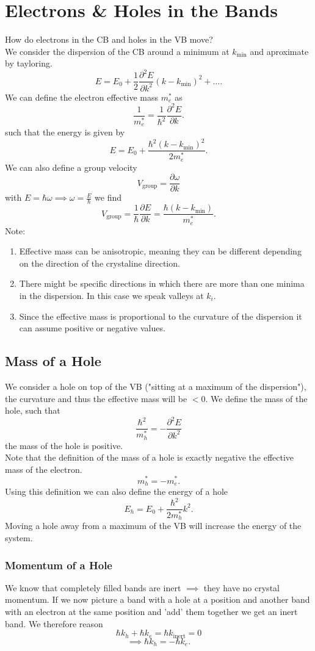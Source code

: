 \documentclass{report}
\begin{document}
\section{Electrons \& Holes in the Bands}
How do electrons in the CB and holes in the VB move?\\
We consider the dispersion of the CB around a minimum at $k_\text{min}$ and aproximate by tayloring. \[
	E = E_0 + \frac{1}{2} \frac{\partial^2 E}{\partial k^2}\left( k - k_\text{min} \right)^2 + \ldots
.\] We can define the electron effective mass $m_e^*$ as \[
\frac{1}{m_e^*} = \frac{1}{\hbar^2} \frac{\partial^2 E}{\partial k}
.\] such that the energy is given by \[
E = E_0 + \frac{\hbar^2 \left( k- k_\text{min} \right)^2}{2m_e^*}
.\] 
We can also define a group velocity \[
V_\text{group} = \frac{\partial \omega}{\partial k}
\] with $E = \hbar \omega \implies \omega = \frac{E}{\hbar}$ we find \[
V_\text{group} = \frac{1}{\hbar} \frac{\partial E}{\partial k} = \frac{\hbar \left( k - k_\text{min} \right) }{m_e^*}
.\] Note: 
\begin{enumerate}
	\item Effective mass can be anisotropic, meaning they can be different depending on the direction of the crystaline direction.
	\item There might be specific directions in which there are more than one minima in the dispersion. In this case we speak valleys at $k_i$.
	\item Since the effective mass is proportional to the curvature of the dispersion it can assume positive or negative values.
\end{enumerate}
\subsection{Mass of a Hole}
We consider a hole on top of the VB ("sitting at a maximum of the dispersion"), the curvature and thus the effective mass will be $< 0$. We define the mass of the hole, such that \[
\frac{\hbar^2}{m_h^*} = - \frac{\partial^2 E}{\partial k^2}
\] the mass of the hole is positive.\\
Note that the definition of the mass of a hole is exactly negative the effective mass of the electron.\[
m_h^* = - m_e^*
.\] 
Using this definition we can also define the energy of a hole \[
E_h = E_0 + \frac{\hbar^2}{2 m_h^*}k^2
.\] Moving a hole away from a maximum of the VB will increase the energy of the system.
\subsubsection{Momentum of a Hole}
We know that completely filled bands are inert $\implies$ they have no crystal momentum. If we now picture a band with a hole at a position and another band with an electron at the same position and 'add' them together we get an inert band. We therefore reason \[
\hbar k_h + \hbar k_e = \hbar k_\text{inert} = 0
\] \[
\implies \hbar k_h = -\hbar k_e
.\]  
\end{document}
